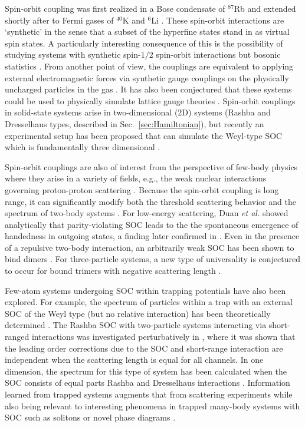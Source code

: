 Spin-orbit coupling was first realized in a Bose condensate of $^{87}$Rb \cite{nature09887} and extended shortly after to Fermi gases of $^{40}$K \cite{PhysRevLett.109.095301} and $^6$Li \cite{PhysRevLett.109.095302}. These spin-orbit interactions are `synthetic' in the sense that a subset of the hyperfine states stand in as virtual spin states. A particularly interesting consequence of this is the possibility of studying systems with synthetic spin-$1/2$ spin-orbit interactions but bosonic statistics \cite{PhysRevA.68.063612,nature09887}. From another point of view, the couplings are equivalent to applying external electromagnetic forces via synthetic gauge couplings on the physically uncharged particles in the gas \cite{Lin:2011,PhysRevLett.107.255301}. It has also been conjectured that these systems could be used to physically simulate lattice gauge theories \cite{Bermudez:2010da,Mazza:2011kf}.  Spin-orbit couplings in solid-state systems arise in two-dimensional (2D) systems (Rashba and Dresselhaus types, described in Sec.~\ref{sec:Hamiltonian}), but recently an experimental setup has been proposed that can simulate the Weyl-type SOC which is fundamentally three dimensional \cite{PhysRevLett.108.235301}.

Spin-orbit couplings are also of interest from the perspective of few-body physics where they arise in a variety of fields, e.g., the weak nuclear interactions governing proton-proton scattering \cite{Haxton:2013aca,deVries:2014vqa}. Because the spin-orbit coupling is long range, it can significantly modify both the threshold scattering behavior and the spectrum of two-body systems \cite{PhysRevA.86.042707}. For low-energy scattering, Duan \textit{et al.} \cite{PhysRevA.87.052708} showed analytically that parity-violating SOC leads to the the spontaneous emergence of handedness in outgoing states, a finding later confirmed in \cite{PhysRevA.91.022706}. Even in the presence of a repulsive two-body interaction, an arbitrarily weak SOC has been shown to bind dimers \cite{PhysRevB.83.094515}. For three-particle systems, a new type of universality is conjectured to occur for bound trimers with negative scattering length \cite{PhysRevLett.112.013201}. 

Few-atom systems undergoing SOC within trapping potentials have also been explored. For example, the spectrum of particles within a trap with an external SOC of the Weyl type (but no relative interaction) has been theoretically determined \cite{anderson2013}. The Rashba SOC with two-particle systems interacting via short-ranged interactions was investigated perturbatively in \cite{PhysRevA.89.033606}, where it was shown that the leading order corrections due to the SOC and short-range interaction are independent when the scattering length is equal for all channels.  In one dimension, the spectrum for this type of system has been calculated when the SOC consists of equal parts Rashba and Dresselhaus interactions \cite{guan2014energy}. Information learned from trapped systems augments that from scattering experiments while also being relevant to interesting phenomena in trapped many-body systems with SOC such as solitons \cite{DarkSolitons,PhysRevA.87.013614} or novel phase diagrams \cite{PhysRevLett.107.270401}.


